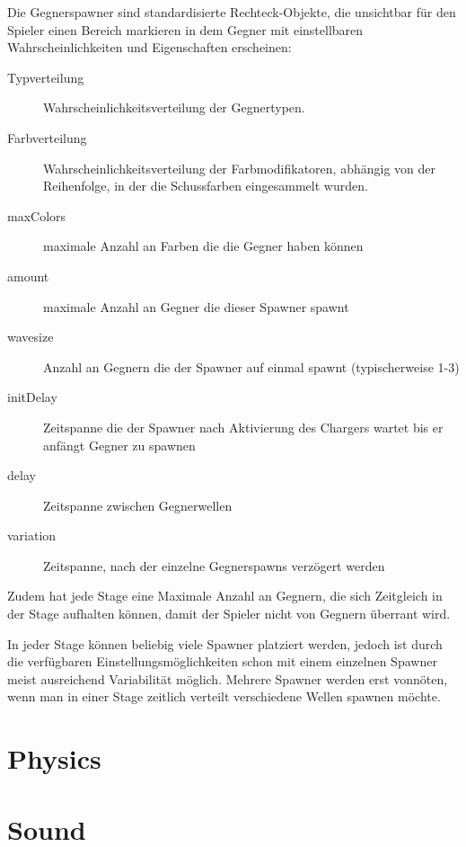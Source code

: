 \documentclass[a4paper,10pt,ngerman,fontsize=12pt]{scrreprt}
\begin{document}
Die Gegnerspawner sind standardisierte Rechteck-Objekte, die unsichtbar für den Spieler einen Bereich markieren in dem Gegner mit einstellbaren Wahrscheinlichkeiten und Eigenschaften erscheinen:

\begin{description}
\item[Typverteilung] Wahrscheinlichkeitsverteilung der Gegnertypen.
\item[Farbverteilung] Wahrscheinlichkeitsverteilung der Farbmodifikatoren, abhängig von der Reihenfolge, in der die Schussfarben eingesammelt wurden.
\item[maxColors] maximale Anzahl an Farben die die Gegner haben können
\item[amount] maximale Anzahl an Gegner die dieser Spawner spawnt
\item[wavesize] Anzahl an Gegnern die der Spawner auf einmal spawnt (typischerweise 1-3)
\item[initDelay] Zeitspanne die der Spawner nach Aktivierung des Chargers wartet bis er anfängt Gegner zu spawnen
\item[delay] Zeitspanne zwischen Gegnerwellen
\item[variation] Zeitspanne, nach der einzelne Gegnerspawns verzögert werden
\end{description}

Zudem hat jede Stage eine Maximale Anzahl an Gegnern, die sich Zeitgleich in der Stage aufhalten können, damit der Spieler nicht von Gegnern überrant wird.

In jeder Stage können beliebig viele Spawner platziert werden, jedoch ist durch die verfügbaren Einstellungsmöglichkeiten schon mit einem einzelnen Spawner meist ausreichend Variabilität möglich. Mehrere Spawner werden erst vonnöten, wenn man in einer Stage zeitlich verteilt verschiedene Wellen spawnen möchte.




\section{Physics}

\lipsum[3]



\section{Sound}

\lipsum[3]
\end{document}
